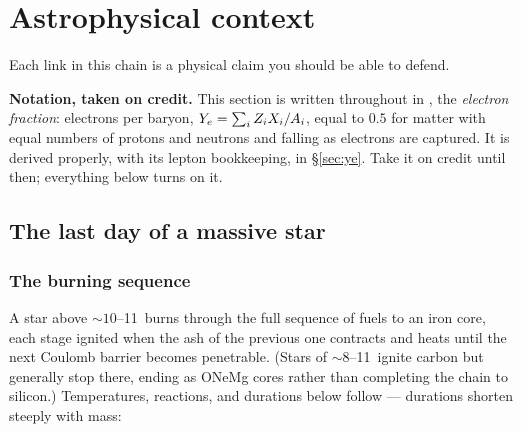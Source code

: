\section{Astrophysical context}
\label{part:context}

Each link in this chain is a physical claim you should be able to defend.

\begin{aside}
\textbf{Notation, taken on credit.} This section is written throughout in \Ye{},
the \emph{electron fraction}: electrons per baryon,
$Y_{e} = \sum_i Z_i X_i / A_i$, equal to $0.5$ for matter with equal numbers of
protons and neutrons and falling as electrons are captured. It is derived
properly, with its lepton bookkeeping, in \S\ref{sec:ye}. Take it on credit
until then; everything below turns on it.
\end{aside}

\subsection{The last day of a massive star}
\label{sec:lastday}

\subsubsection{The burning sequence}
\label{sec:burningsequence}

A star above ${\sim}10$--11\,\Msun{} burns through the full sequence of fuels
to an iron core, each stage ignited when the ash of the previous one contracts
and heats until the next Coulomb barrier becomes penetrable. (Stars of
${\sim}8$--11\,\Msun{} ignite carbon but generally stop there, ending as ONeMg
cores rather than completing the chain to silicon.) Temperatures, reactions,
and durations below follow \citet{whw2002} --- durations shorten steeply with
mass:

